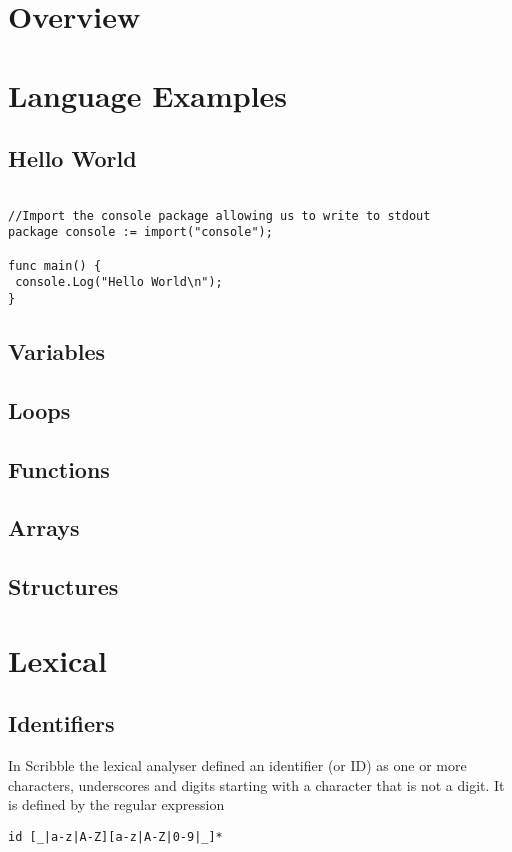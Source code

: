 \documentclass[]{final_report}
\begin{document}
\chapter{Overview}

\chapter{Language Examples}

\section{Hello World}

\begin{verbatim}

//Import the console package allowing us to write to stdout
package console := import("console");

func main() {
 console.Log("Hello World\n");
}
\end{verbatim}

\section{Variables}
\section{Loops}
\section{Functions}
\section{Arrays}
\section{Structures}

\chapter{Lexical}

\section{Identifiers}

In Scribble the lexical analyser defined an identifier (or ID) as one or more characters, underscores and digits starting with a character that is not a digit. It is defined by the regular expression
\begin{verbatim}
id [_|a-z|A-Z][a-z|A-Z|0-9|_]*
\end{verbatim}
\end{document}
